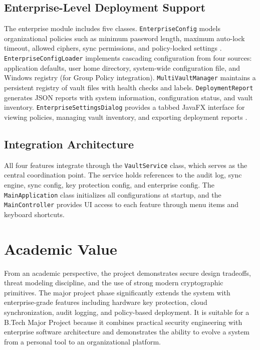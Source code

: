 \subsection{Enterprise-Level Deployment Support}
The enterprise module includes five classes. \texttt{EnterpriseConfig} models organizational policies such as minimum password length, maximum auto-lock timeout, allowed ciphers, sync permissions, and policy-locked settings \cite{sandhu_access_control}. \texttt{EnterpriseConfigLoader} implements cascading configuration from four sources: application defaults, user home directory, system-wide configuration file, and Windows registry (for Group Policy integration). \texttt{MultiVaultManager} maintains a persistent registry of vault files with health checks and labels. \texttt{DeploymentReport} generates JSON reports with system information, configuration status, and vault inventory. \texttt{EnterpriseSettingsDialog} provides a tabbed JavaFX interface for viewing policies, managing vault inventory, and exporting deployment reports \cite{nist_km}.

\subsection{Integration Architecture}
All four features integrate through the \texttt{VaultService} class, which serves as the central coordination point. The service holds references to the audit log, sync engine, sync config, key protection config, and enterprise config. The \texttt{MainApplication} class initializes all configurations at startup, and the \texttt{MainController} provides UI access to each feature through menu items and keyboard shortcuts.

\section{Academic Value}
From an academic perspective, the project demonstrates secure design tradeoffs, threat modeling discipline, and the use of strong modern cryptographic primitives. The major project phase significantly extends the system with enterprise-grade features including hardware key protection, cloud synchronization, audit logging, and policy-based deployment. It is suitable for a B.Tech Major Project because it combines practical security engineering with enterprise software architecture and demonstrates the ability to evolve a system from a personal tool to an organizational platform.
